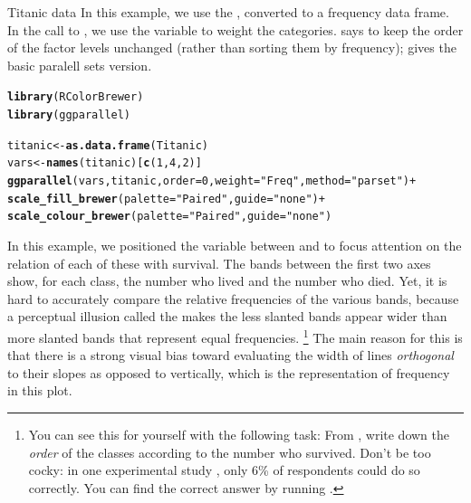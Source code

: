 \documentclass[11pt]{book}\usepackage[]{graphicx}\usepackage[]{color}
\makeatletter
\newcommand{\hlnum}[1]{\textcolor[rgb]{0.686,0.059,0.569}{#1}}%
\newcommand{\hlstr}[1]{\textcolor[rgb]{0.192,0.494,0.8}{#1}}%
\newcommand{\hlopt}[1]{\textcolor[rgb]{0,0,0}{#1}}%
\newcommand{\hlstd}[1]{\textcolor[rgb]{0.345,0.345,0.345}{#1}}%
\newcommand{\hlkwb}[1]{\textcolor[rgb]{0.69,0.353,0.396}{#1}}%
\newcommand{\hlkwc}[1]{\textcolor[rgb]{0.333,0.667,0.333}{#1}}%
\newcommand{\hlkwd}[1]{\textcolor[rgb]{0.737,0.353,0.396}{\textbf{#1}}}%
\newenvironment{kframe}{%
 \def\at@end@of@kframe{}%
 \ifinner\ifhmode%
  \def\at@end@of@kframe{\end{minipage}}%
  \begin{minipage}{\columnwidth}%
 \fi\fi%
 \def\FrameCommand##1{\hskip\@totalleftmargin \hskip-\fboxsep
 \colorbox{shadecolor}{##1}\hskip-\fboxsep
     \hskip-\linewidth \hskip-\@totalleftmargin \hskip\columnwidth}%
 \MakeFramed {\advance\hsize-\width
   \@totalleftmargin\z@ \linewidth\hsize
   \@setminipage}}%
 {\par\unskip\endMakeFramed%
 \at@end@of@kframe}
\newenvironment{knitrout}{}{} %
\renewenvironment{knitrout}{\small\renewcommand{\baselinestretch}{.85}}{} %
\makeatother
\begin{document}
\begin{Example}{Titanic data}
In this example, we use the , converted to a frequency data frame.
In the call to , we use the  variable to weight
the categories.   says to keep the order of the factor levels 
unchanged (rather than sorting them by frequency);  gives the 
basic paralell sets version.

\begin{knitrout}
\color{fgcolor}\begin{kframe}
\begin{alltt}
\hlkwd{library}\hlstd{(RColorBrewer)}
\hlkwd{library}\hlstd{(ggparallel)}
\end{alltt}


{\ttfamily\noindent\bfseries\color{errorcolor}{\#\# Error: there is no package called 'ggparallel'}}\begin{alltt}
\hlstd{titanic} \hlkwb{<-} \hlkwd{as.data.frame}\hlstd{(Titanic)}
\hlstd{vars} \hlkwb{<-} \hlkwd{names}\hlstd{(titanic)[}\hlkwd{c}\hlstd{(}\hlnum{1}\hlstd{,} \hlnum{4}\hlstd{,} \hlnum{2}\hlstd{)]}
\hlkwd{ggparallel}\hlstd{(vars, titanic,} \hlkwc{order}\hlstd{=}\hlnum{0}\hlstd{,} \hlkwc{weight}\hlstd{=}\hlstr{"Freq"}\hlstd{,} \hlkwc{method}\hlstd{=}\hlstr{"parset"}\hlstd{)} \hlopt{+}
  \hlkwd{scale_fill_brewer}\hlstd{(}\hlkwc{palette}\hlstd{=}\hlstr{"Paired"}\hlstd{,} \hlkwc{guide}\hlstd{=}\hlstr{"none"}\hlstd{)} \hlopt{+}
  \hlkwd{scale_colour_brewer}\hlstd{(}\hlkwc{palette}\hlstd{=}\hlstr{"Paired"}\hlstd{,} \hlkwc{guide}\hlstd{=}\hlstr{"none"}\hlstd{)}
\end{alltt}


{\ttfamily\noindent\bfseries{}}\end{kframe}
\end{knitrout}

In this example, we positioned the variable  between
 and  to focus attention on the relation of each
of these with survival.  The bands between the 
first two axes show, for each class, the number who lived and the number who
died.
Yet, it is hard to accurately compare the relative frequencies of the
various bands, because a perceptual illusion called the 
makes the less slanted bands appear wider than more slanted bands that represent
equal frequencies.%
\footnote{
You can see this for yourself with the following task: From ,
write down the \emph{order} of the classes according to the number who survived.
Don't be too cocky: in one experimental study \citep{HofmannVendettuoli:2013},
only 6\% of respondents could do so correctly.
You can find the correct answer by running .
}
The main reason for this is that
there is a strong visual bias toward evaluating
the width of lines \emph{orthogonal} to their slopes as opposed to vertically,
which is the representation of frequency in this plot.

\end{Example}
\end{document}
